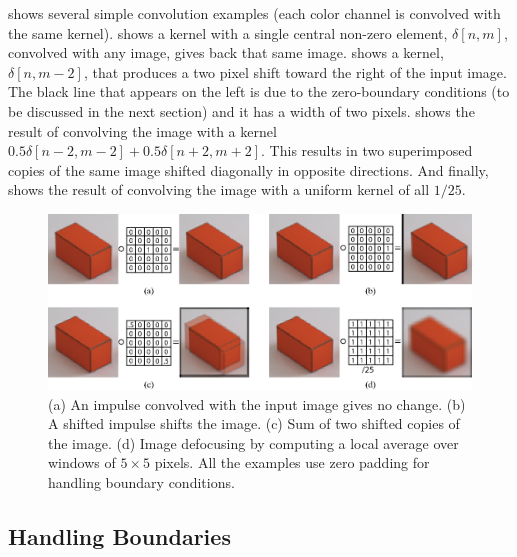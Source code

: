 \Fig{\ref{fig:convExamps}} shows several simple convolution examples (each color channel is convolved with the same kernel).  shows a kernel with a single central non-zero element, $\delta \left[n,m\right]$, convolved with any image, gives back that same image.
 shows a kernel, $\delta \left[n,m-2\right]$, that produces a two pixel shift toward the right of the input image. The black line that appears on the left is due to the zero-boundary conditions (to be discussed in the next section) and it has a width of two pixels.   shows the result of convolving the image with a kernel $0.5 \delta \left[n-2,m-2\right]+ 0.5 \delta \left[n+2,m+2\right]$. This results in two superimposed copies of the same image shifted diagonally in opposite directions. And finally,  shows the result of convolving the image with a uniform kernel of all $1/25$.


\begin{figure}[t]
	\includegraphics[width=1\linewidth]{figures/linear_image_filtering/examples_cube2.eps}
	\caption{(a) An impulse convolved with the input image gives no
		change.  (b) A shifted impulse shifts the image.  (c) Sum of two shifted copies of the image.  (d) Image defocusing by computing a local average over windows of $5 \times 5$ pixels. All the examples use zero padding for handling boundary conditions.
	}
	\label{fig:convExamps}
\end{figure}

\subsection{Handling Boundaries}

